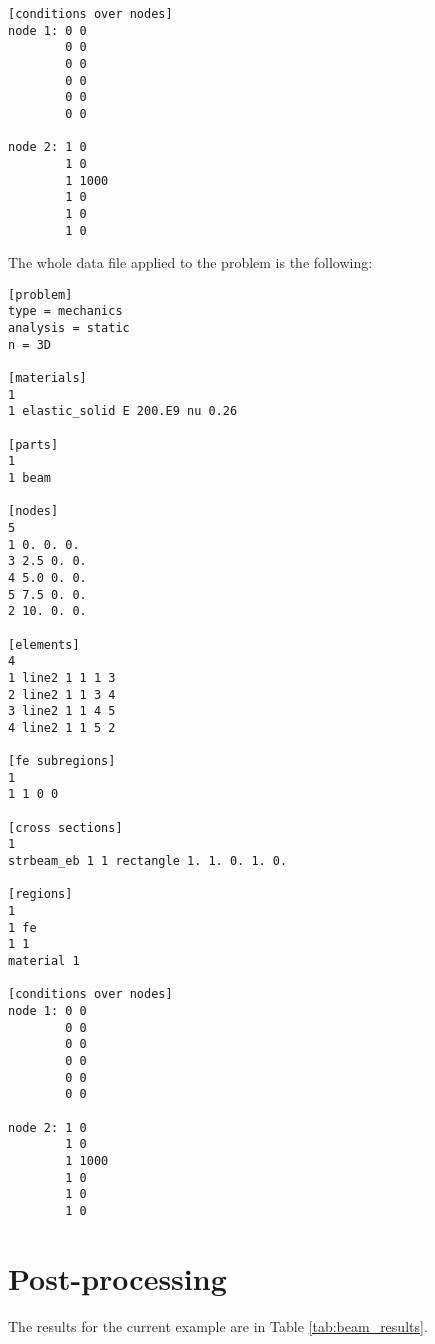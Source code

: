 \documentclass[a4]{article}
\begin{document}
\begin{Verbatim}	
[conditions over nodes]
node 1: 0 0
        0 0
        0 0
        0 0
        0 0
        0 0

node 2: 1 0
        1 0
        1 1000
        1 0
        1 0
        1 0
\end{Verbatim}

The whole data file applied to the problem is the following:

\begin{Verbatim}
[problem]
type = mechanics
analysis = static
n = 3D

[materials]
1
1 elastic_solid E 200.E9 nu 0.26

[parts]
1
1 beam

[nodes]
5
1 0. 0. 0.
3 2.5 0. 0.
4 5.0 0. 0.
5 7.5 0. 0.
2 10. 0. 0.

[elements]
4
1 line2 1 1 1 3
2 line2 1 1 3 4
3 line2 1 1 4 5
4 line2 1 1 5 2

[fe subregions]
1
1 1 0 0

[cross sections]
1
strbeam_eb 1 1 rectangle 1. 1. 0. 1. 0.

[regions]
1
1 fe
1 1
material 1

[conditions over nodes]
node 1: 0 0
        0 0
        0 0
        0 0
        0 0
        0 0

node 2: 1 0
        1 0
        1 1000
        1 0
        1 0
        1 0
\end{Verbatim}

\section{Post-processing}

The results for the current example are in Table \ref{tab:beam_results}.
\end{document}
